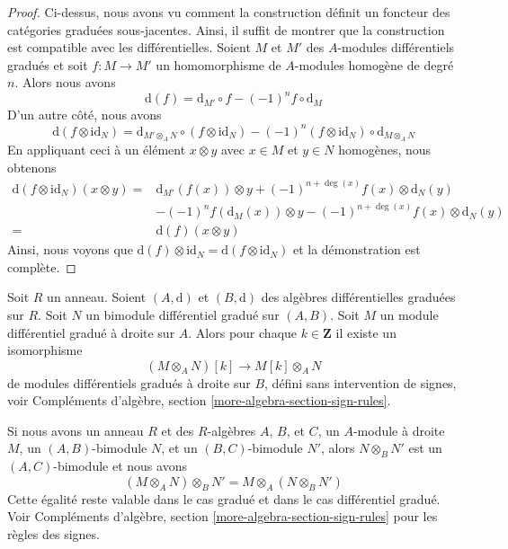 \begin{proof}
Ci-dessus, nous avons vu comment la construction définit un foncteur des
catégories graduées sous-jacentes. Ainsi, il suffit de montrer que la
construction est compatible avec les différentielles. Soient $M$ et $M'$ des
$A$-modules différentiels gradués et soit $f : M \to M'$ un homomorphisme de
$A$-modules homogène de degré $n$. Alors nous avons
$$
\text{d}(f) = \text{d}_{M'} \circ f - (-1)^n f \circ \text{d}_M
$$
D'un autre côté, nous avons
$$
\text{d}(f \otimes \text{id}_N) =
\text{d}_{M' \otimes_A N} \circ
(f \otimes \text{id}_N) -
(-1)^n
(f \otimes \text{id}_N) \circ \text{d}_{M \otimes_A N}
$$
En appliquant ceci à un élément $x \otimes y$ avec $x \in M$ et $y
\in N$ homogènes, nous obtenons
\begin{align*}
\text{d}(f \otimes \text{id}_N)(x \otimes y)
= &
\text{d}_{M'}(f(x)) \otimes y + (-1)^{n + \deg(x)}f(x) \otimes \text{d}_N(y) \\ &
- (-1)^n f(\text{d}_M(x)) \otimes y -
(-1)^{n + \deg(x)}f(x) \otimes \text{d}_N(y) \\ = &
\text{d}(f)
(x \otimes y)
\end{align*}
Ainsi, nous voyons que $\text{d}(f) \otimes \text{id}_N =
\text{d}(f \otimes \text{id}_N)$ et la démonstration est complète.
\end{proof}

\begin{remark}
\label{remark-shift-tensor-no-sign}
Soit $R$ un anneau. Soient $(A, \text{d})$ et $(B, \text{d})$
des algèbres différentielles graduées sur $R$. Soit $N$ un
bimodule différentiel gradué sur $(A, B)$. Soit $M$ un module différentiel gradué
à droite sur $A$. Alors pour chaque $k \in \mathbf{Z}$ il existe
un isomorphisme
$$
(M \otimes_A N)[k] \longrightarrow
M[k] \otimes_A N
$$
de modules différentiels gradués à droite sur $B$, défini sans intervention
de signes, voir Compléments d'algèbre, section \ref{more-algebra-section-sign-rules}.
\end{remark}

\noindent
Si nous avons un anneau $R$ et des $R$-algèbres $A$, $B$, et
$C$, un $A$-module à droite $M$, un $(A, B)$-bimodule $N$, et un
$(B, C)$-bimodule $N'$, alors
$N \otimes_B N'$ est un $(A, C)$-bimodule et nous avons
$$
(M \otimes_A N) \otimes_B N' = M \otimes_A (N \otimes_B N')
$$
Cette égalité reste valable dans le cas gradué et dans le cas différentiel
gradué. Voir Compléments d'algèbre, section \ref{more-algebra-section-sign-rules} pour les
règles des signes.






